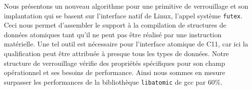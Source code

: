 Nous présentons un nouveau algorithme pour une primitive de verrouillage et
son implantation qui se basent sur l'interface natif de Linux, l'appel
système \texttt{futex}.
%
Ceci nous permet d'assembler le support à la compilation de structures de
données atomiques tant qu'il ne peut pas être réalisé par une instruction
matérielle.
%
Une tel outil est nécessaire pour l'interface atomique de C11, car ici la
qualification  peut être attribuée à presque tous les types de
données.
%
Notre structure de verrouillage vérifie des propriétés spécifiques pour son
champ opérationnel et ses besoins de performance.
%
Ainsi nous sommes en mesure surpasser les performances de la bibliothèque
\texttt{libatomic} de gcc par 60\%.

